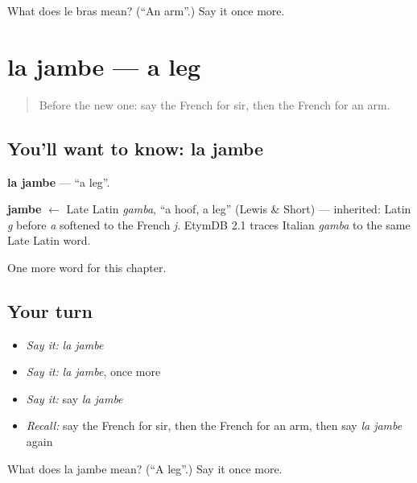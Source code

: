 \begin{tcolorbox}[breakable,colback=teal!4,colframe=teal!35!black,title={Before you move on}]
What does le bras mean? (\textquotedblleft{}An arm\textquotedblright{}.) Say it once more.
\end{tcolorbox}
\section[la jambe]{la jambe — a leg}

\label{lesson:FR-C49-jambe}



\begin{quote}
Before the new one: say the French for sir, then the French for an arm.
\end{quote}

\subsection*{You'll want to know: la jambe}
\textbf{la jambe} — \textquotedblleft{}a leg\textquotedblright{}.

\begin{cousinweb}
\textbf{jambe} $\leftarrow$ Late Latin \emph{gamba}, \textquotedblleft{}a hoof, a leg\textquotedblright{} (Lewis \& Short) — inherited: Latin \emph{g} before \emph{a} softened to the French \emph{j}. EtymDB 2.1 traces Italian \emph{gamba} to the same Late Latin word.
\end{cousinweb}

\begin{grammarlens}[title={What you've built}]
One more word for this chapter.
\end{grammarlens}

\subsection*{Your turn}
\begin{itemize}
\raggedright
  \item \emph{Say it:} \emph{la jambe}
  \item \emph{Say it:} \emph{la jambe}, once more
  \item \emph{Say it:} say \emph{la jambe}
  \item \emph{Recall:} say the French for sir, then the French for an arm, then say \emph{la jambe} again
\end{itemize}

\begin{tcolorbox}[breakable,colback=teal!4,colframe=teal!35!black,title={Before you move on}]
What does la jambe mean? (\textquotedblleft{}A leg\textquotedblright{}.) Say it once more.
\end{tcolorbox}
